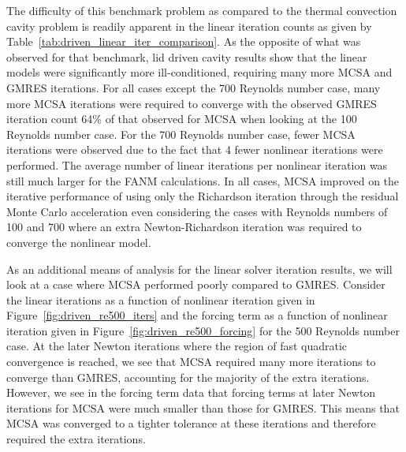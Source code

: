 The difficulty of this benchmark problem as compared to the thermal
convection cavity problem is readily apparent in the linear iteration
counts as given by Table~\ref{tab:driven_linear_iter_comparison}. As
the opposite of what was observed for that benchmark, lid driven
cavity results show that the linear models were significantly more
ill-conditioned, requiring many more MCSA and GMRES iterations. For
all cases except the 700 Reynolds number case, many more MCSA
iterations were required to converge with the observed GMRES iteration
count 64\% of that observed for MCSA when looking at the 100 Reynolds
number case. For the 700 Reynolds number case, fewer MCSA iterations
were observed due to the fact that 4 fewer nonlinear iterations were
performed. The average number of linear iterations per nonlinear
iteration was still much larger for the FANM calculations. In all
cases, MCSA improved on the iterative performance of using only the
Richardson iteration through the residual Monte Carlo acceleration
even considering the cases with Reynolds numbers of 100 and 700 where
an extra Newton-Richardson iteration was required to converge the
nonlinear model.

As an additional means of analysis for the linear solver iteration
results, we will look at a case where MCSA performed poorly compared
to GMRES. Consider the linear iterations as a function of nonlinear
iteration given in Figure~\ref{fig:driven_re500_iters} and the forcing
term as a function of nonlinear iteration given in
Figure~\ref{fig:driven_re500_forcing} for the 500 Reynolds number
case. At the later Newton iterations where the region of fast
quadratic convergence is reached, we see that MCSA required many more
iterations to converge than GMRES, accounting for the majority of the
extra iterations. However, we see in the forcing term data that
forcing terms at later Newton iterations for MCSA were much smaller
than those for GMRES. This means that MCSA was converged to a tighter
tolerance at these iterations and therefore required the extra
iterations.

